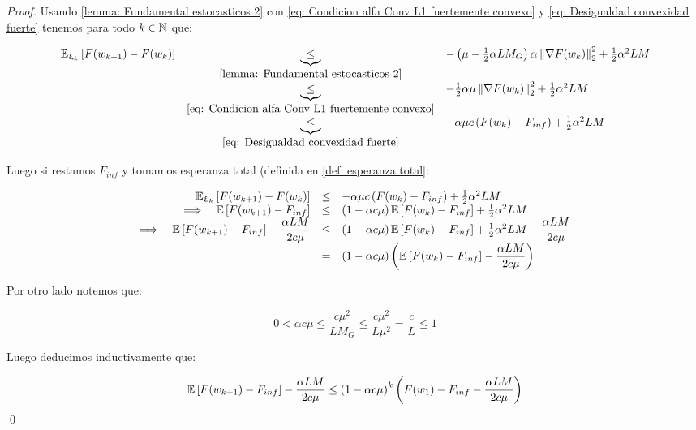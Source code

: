 \begin{proof}
	Usando \ref{lemma: Fundamental estocasticos 2} con \ref{eq: Condicion alfa Conv L1 fuertemente convexo} y \ref{eq: Desigualdad convexidad fuerte} tenemos para todo $k \in {\mathbb{N}}$ que:
	
	\begin{equation*}
	\begin{array}{rcl}
		\mathbb{E}_{\upxi_{k}} \left[F(w_{k+1}) - F(w_k)\right] & \underbrace{\leq}_{\ref{lemma: Fundamental estocasticos 2}} & - \left( \mu - \frac{1}{2} \alpha L M_G \right)\alpha \left\lVert\nabla F(w_k)\right\rVert_2^2 + \frac{1}{2} \alpha^2 L M \\
		& \underbrace{\leq}_{\ref{eq: Condicion alfa Conv L1 fuertemente convexo}} & - \frac{1}{2} \alpha \mu \left\lVert\nabla F(w_k)\right\rVert_2^2 + \frac{1}{2} \alpha ^2 LM \\
		& \underbrace{\leq}_{\ref{eq: Desigualdad convexidad fuerte}} & - \alpha \mu c \left(F(w_k) - F_{inf} \right)+ \frac{1}{2} \alpha ^2 LM 
	\end{array}
	\end{equation*}
	
	Luego si restamos $F_{inf}$ y tomamos esperanza total (definida en \ref{def: esperanza total}:
	
		\begin{equation*}
	\begin{array}{rcl}
	\mathbb{E}_{\upxi_{k}} \left[F(w_{k+1}) - F(w_k)\right] & \leq & - \alpha \mu c \left(F(w_k) - F_{inf} \right)+ \frac{1}{2} \alpha ^2 LM  \\
	\Longrightarrow \quad \mathbb{E} \left[F(w_{k+1}) - F_{inf}\right] & \leq & \left(1 - \alpha c \mu  \right) \mathbb{E} \left[F(w_k) - F_{inf}\right] +   \frac{1}{2} \alpha ^2 LM  \\
	\Longrightarrow \quad \mathbb{E} \left[F(w_{k+1}) - F_{inf}\right] - \dfrac{\alpha L M}{2 c \mu } & \leq & \left(1 - \alpha c \mu  \right) \mathbb{E} \left[F(w_k) - F_{inf}\right] +   \frac{1}{2} \alpha ^2 LM  - \dfrac{\alpha L M}{2 c \mu } \\
	& = &  \left(1 - \alpha c \mu  \right)  \left(\mathbb{E} \left[F(w_k) - F_{inf}\right]  -  \dfrac{\alpha L M}{2 c \mu }  \right)
	\end{array}
	\end{equation*}
	
	Por otro lado notemos que:
	
	\begin{equation*}
	 0 < \alpha c \mu \leq \dfrac{c \mu^2}{L M_G} \leq \dfrac{c \mu ^2}{L \mu ^2} = \frac{c}{L} \leq 1
	\end{equation*}
	
	Luego deducimos inductivamente que:
	
	\begin{equation*}
		\mathbb{E} \left[F(w_{k+1}) - F_{inf}\right] - \dfrac{\alpha L M}{2 c \mu } \leq \left(1 - \alpha c \mu \right)^{k} \left(F(w_1) - F_{inf} - \dfrac{\alpha LM}{2 c \mu} \right)
	\end{equation*}
	\qed
\end{proof}

